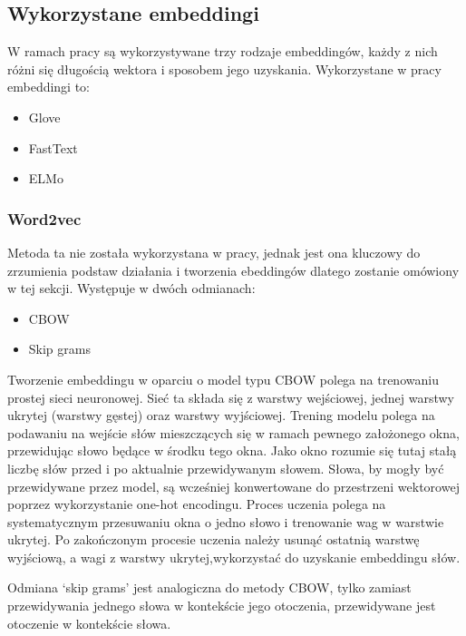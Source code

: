 \subsection{Wykorzystane embeddingi}
W ramach pracy są wykorzystywane trzy rodzaje embeddingów, każdy z nich różni się długością wektora i sposobem jego uzyskania. Wykorzystane w pracy embeddingi to:
\begin{itemize}
    \item Glove
    \item FastText
    \item ELMo
\end{itemize}



\subsubsection{Word2vec}
Metoda ta nie została wykorzystana w pracy, jednak jest ona kluczowy do zrzumienia podstaw działania i tworzenia ebeddingów dlatego zostanie omówiony w tej sekcji. Występuje w dwóch odmianach:

\begin{itemize}
    \item CBOW
    \item Skip grams
\end{itemize}



Tworzenie embeddingu w oparciu o model typu CBOW polega na trenowaniu prostej sieci neuronowej. Sieć ta składa się z warstwy wejściowej, jednej warstwy ukrytej (warstwy gęstej) oraz warstwy wyjściowej. Trening modelu polega na podawaniu na wejście słów mieszczących się w ramach pewnego założonego okna, przewidując słowo będące w środku tego okna. Jako okno rozumie się tutaj stałą liczbę słów przed i po aktualnie przewidywanym słowem. Słowa, by mogły być przewidywane przez model, są wcześniej konwertowane do przestrzeni wektorowej poprzez wykorzystanie one-hot encodingu. Proces uczenia polega na systematycznym przesuwaniu okna o jedno słowo i trenowanie wag w warstwie ukrytej. Po zakończonym procesie uczenia należy usunąć ostatnią warstwę wyjściową, a wagi z warstwy ukrytej,wykorzystać do uzyskanie embeddingu słów.\cite{Mikolov2013}

Odmiana ‘skip grams’ jest analogiczna do metody CBOW, tylko zamiast przewidywania jednego słowa w kontekście jego otoczenia, przewidywane jest otoczenie w kontekście słowa.


